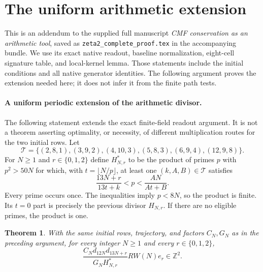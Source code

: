 \documentclass[11pt]{article}
\newtheorem{theorem}{Theorem}
\begin{document}
\section{The uniform arithmetic extension}
This is an addendum to the supplied full manuscript
\emph{CMF conservation as an arithmetic tool}, saved as
\texttt{zeta2\_complete\_proof.tex} in the accompanying bundle.
We use its exact native readout, baseline normalization, eight-cell
signature table, and local-kernel lemma. Those statements include the
initial conditions and all native generator identities. The following
argument proves the extension needed here; it does not infer it from
the finite path tests.
\paragraph{A uniform periodic extension of the arithmetic divisor.}
The following statement extends the exact finite-field readout argument.
It is not a theorem asserting optimality, or necessity, of different
multiplication routes for the two initial rows.
Let
\[
 \mathcal T=\{(2,8,1),(3,9,2),(4,10,3),
                (5,8,3),(6,9,4),(12,9,8)\}.
\]
For $N\ge1$ and $r\in\{0,1,2\}$ define $H^*_{N,r}$ to be the product
of primes $p$ with $p^2>50N$ for which, with $t=\lfloor N/p\rfloor$,
at least one $(k,A,B)\in\mathcal T$ satisfies
\[
 \frac{13N+r}{13t+k}<p<\frac{AN}{At+B}.
 \tag{L1}
\]
Every prime occurs once. The inequalities imply $p<8N$, so the product
is finite. Its $t=0$ part is precisely the previous divisor $H_{N,r}$.
If there are no eligible primes, the product is one.

\begin{theorem}
With the same initial rows, trajectory, and factors $C_N,G_N$ as in
the preceding argument, for every integer $N\ge1$ and every
$r\in\{0,1,2\}$,
\[
 \boxed{\frac{C_Nd_{12N}d_{13N+r}}{G_NH^*_{N,r}}
             RW(N)e_r\in\mathbb Z^2.}
\]
\end{theorem}
\end{document}
